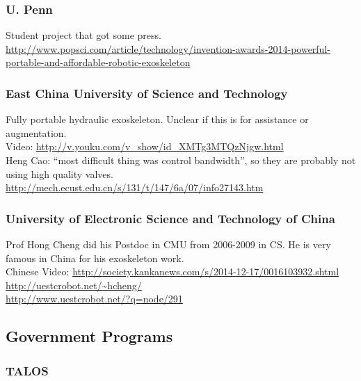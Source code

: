 \subsubsection{U. Penn}

\noindent
Student project that got some press.\\
\url{http://www.popsci.com/article/technology/invention-awards-2014-powerful-portable-and-affordable-robotic-exoskeleton}\\

\subsubsection{East China University of Science and Technology}

\noindent
Fully portable hydraulic exoskeleton. Unclear if this is for
assistance or augmentation.\\
Video: \url{http://v.youku.com/v_show/id_XMTg3MTQzNjgw.html}\\
Heng Cao: ``most difficult thing was control bandwidth'', so they
are probably not using high quality valves.\\
\url{http://mech.ecust.edu.cn/s/131/t/147/6a/07/info27143.htm}

\subsubsection{University of Electronic Science and Technology of China}

\noindent
Prof Hong Cheng did his Postdoc in CMU from 2006-2009 in CS.
He is very famous in China for his exoskeleton work.\\
Chinese Video: \url{http://society.kankanews.com/s/2014-12-17/0016103932.shtml}\\
\url{http://uestcrobot.net/~hcheng/}\\
\url{http://www.uestcrobot.net/?q=node/291}\\


\subsection{Government Programs}

\subsubsection{TALOS}

